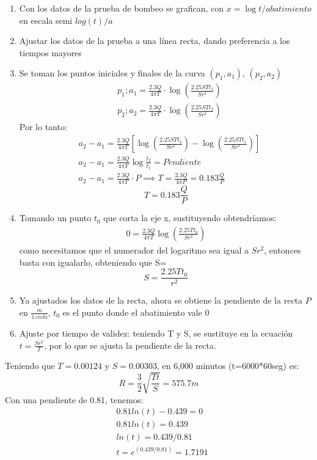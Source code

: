 \begin{enumerate}
    \item Con los datos de la prueba de bombeo se grafican, con $x= \log{t}/ abatimiento$ en escala semi $log(t)/a$
    \item Ajustar los datos de la prueba a una línea recta, dando preferencia a los tiempos mayores
    \item Se toman los puntos iniciales y finales de la curva $(p_1,a_1),\, (p_2,a_2)$
    \begin{align}
        &p_1;a_1 = \frac{2.3Q}{4\pi T} \cdot \log{\left(\frac{2.25STt_1}{Sr^2}\right)}\\
        &p_2;a_2 = \frac{2.3Q}{4\pi T} \cdot \log{\left(\frac{2.25STt_2}{Sr^2}\right)} 
    \end{align}
    Por lo tanto:
    \begin{align*}
        &a_2 - a_1 = \frac{2.3Q}{4\pi T}\left[\log{\left(\frac{2.25STt_2}{Sr^2}\right)} - \log{\left(\frac{2.25STt_1}{Sr^2}\right)} \right]\\
        &a_2 - a_1 = \frac{2.3Q}{4\pi T}\log{\frac{t_2}{t_1}} = Pendiente\\
        &a_2 - a_1 = \frac{2.3Q}{4\pi T} \cdot P \implies T = \frac{2.3Q}{4\pi P} = 0.183 \frac{Q}{P} 
    \end{align*}
    \begin{equation}
        T = 0.183 \frac{Q}{P}
    \end{equation}
    \item Tomando un punto $t_0$ que corta la eje x, sustituyendo obtendríamos:
    \begin{align*}
        0 = \frac{2.3Q}{4\pi T} \log{\left(\frac{2.25Tt_0}{Sr^2}\right)} 
    \end{align*}
    como necesitamos que el numerador del logaritmo sea igual a $Sr^2$, entonces basta con igualarlo, obteniendo que S=
    \begin{equation}
        S = \frac{2.25Tt_0}{r^2}
    \end{equation}
    \item Ya ajustados los datos de la recta, ahora se obtiene la pendiente de la recta $P$ en $\frac{m}{1\, ciclo}$, $t_0$ es el punto donde el abatimiento vale 0
    \item Ajuste por tiempo de validez: teniendo T y S, se sustituye en la ecuación $t=\frac{Sr^2}{T}$, por lo que se ajusta la pendiente de la recta. 
\end{enumerate}
Teniendo que $T= 0.00124$ y $S= 0.00303$, en 6,000 minutos (t=6000*60seg) es:
\begin{equation}
    R = \frac{3}{2} \sqrt{\frac{Tt}{S}} = 575.7m
\end{equation}
Con una pendiente de 0.81, tenemos:
\begin{align*}
&0.81ln(t)-0.439=0\\
&0.81ln(t)= 0.439\\
&ln(t)= 0.439/0.81\\
&t= e^(0.439/0.81) = 1.7191
\end{align*}
